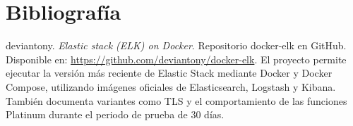 \documentclass[
  coursetitle={Cómputo Nube y Tecnologías Emergentes},
  coursehours={96},
  coursedate={Verano 2026},
  doctype={Laboratorio},
  otherlangs={english,french},
  authorname={Lázaro},
  authorsurname={Bustio-Martínez},
  authortitle={PhD},
  role={Profesor Investigador},
  email={lbustio@inaoe.mx},
  phone={5559504000},
  ext={7459},
  institution={Instituto Nacional de Astrofísica, Óptica y Electrónica (INAOE)},
  department={Maestría en Ciencias en Tecnologías de Seguridad},
  address={Luis Enrique Erro 1, Sta. Ma. Tonantzintla, San Andrés Cholula, CP 72840, Puebla, México},
  margin={0.5in}
]{../../lbustio_lecture_notes}
\begin{document}
\section{Bibliografía}

\begin{thebibliography}{9}

deviantony.
\textit{Elastic stack (ELK) on Docker}.
Repositorio docker-elk en GitHub.
Disponible en: \url{https://github.com/deviantony/docker-elk}.
El proyecto permite ejecutar la versión más reciente de Elastic Stack mediante Docker y Docker Compose, utilizando imágenes oficiales de Elasticsearch, Logstash y Kibana. También documenta variantes como TLS y el comportamiento de las funciones Platinum durante el periodo de prueba de 30 días.

\end{thebibliography}
\end{document}
